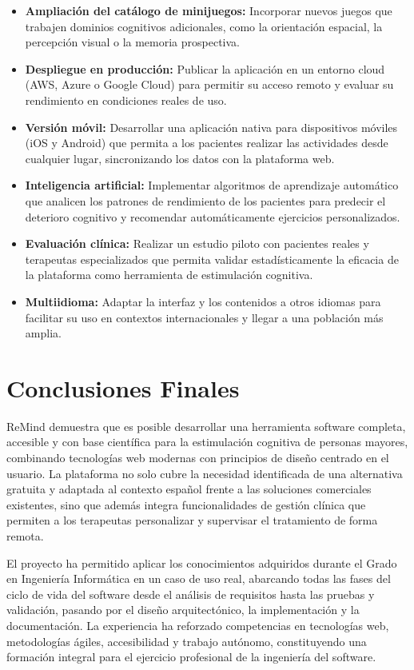 \begin{itemize}
    \item \textbf{Ampliación del catálogo de minijuegos:} Incorporar nuevos juegos que trabajen dominios cognitivos adicionales, como la orientación espacial, la percepción visual o la memoria prospectiva.
    \item \textbf{Despliegue en producción:} Publicar la aplicación en un entorno cloud (AWS, Azure o Google Cloud) para permitir su acceso remoto y evaluar su rendimiento en condiciones reales de uso.
    \item \textbf{Versión móvil:} Desarrollar una aplicación nativa para dispositivos móviles (iOS y Android) que permita a los pacientes realizar las actividades desde cualquier lugar, sincronizando los datos con la plataforma web.
    \item \textbf{Inteligencia artificial:} Implementar algoritmos de aprendizaje automático que analicen los patrones de rendimiento de los pacientes para predecir el deterioro cognitivo y recomendar automáticamente ejercicios personalizados.
    \item \textbf{Evaluación clínica:} Realizar un estudio piloto con pacientes reales y terapeutas especializados que permita validar estadísticamente la eficacia de la plataforma como herramienta de estimulación cognitiva.
    \item \textbf{Multiidioma:} Adaptar la interfaz y los contenidos a otros idiomas para facilitar su uso en contextos internacionales y llegar a una población más amplia.
\end{itemize}

\section{Conclusiones Finales}

ReMind demuestra que es posible desarrollar una herramienta software completa, accesible y con base científica para la estimulación cognitiva de personas mayores, combinando tecnologías web modernas con principios de diseño centrado en el usuario. La plataforma no solo cubre la necesidad identificada de una alternativa gratuita y adaptada al contexto español frente a las soluciones comerciales existentes, sino que además integra funcionalidades de gestión clínica que permiten a los terapeutas personalizar y supervisar el tratamiento de forma remota.

El proyecto ha permitido aplicar los conocimientos adquiridos durante el Grado en Ingeniería Informática en un caso de uso real, abarcando todas las fases del ciclo de vida del software desde el análisis de requisitos hasta las pruebas y validación, pasando por el diseño arquitectónico, la implementación y la documentación. La experiencia ha reforzado competencias en tecnologías web, metodologías ágiles, accesibilidad y trabajo autónomo, constituyendo una formación integral para el ejercicio profesional de la ingeniería del software.